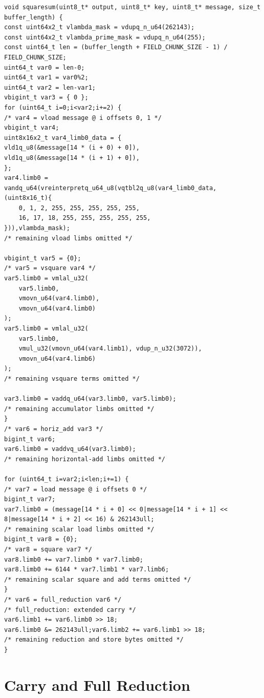 \begin{lstlisting}[style=thesisC,basicstyle=\scriptsize\ttfamily,caption={Excerpt of generated NEON C for the square-sum running example.},label={lst:squaresum-neon}]
void squaresum(uint8_t* output, uint8_t* key, uint8_t* message, size_t buffer_length) {
const uint64x2_t vlambda_mask = vdupq_n_u64(262143);
const uint64x2_t vlambda_prime_mask = vdupq_n_u64(255);
const uint64_t len = (buffer_length + FIELD_CHUNK_SIZE - 1) / FIELD_CHUNK_SIZE;
uint64_t var0 = len-0;
uint64_t var1 = var0%2;
uint64_t var2 = len-var1;
vbigint_t var3 = { 0 };
for (uint64_t i=0;i<var2;i+=2) {
/* var4 = vload message @ i offsets 0, 1 */
vbigint_t var4;
uint8x16x2_t var4_limb0_data = {
vld1q_u8(&message[14 * (i + 0) + 0]),
vld1q_u8(&message[14 * (i + 1) + 0]),
};
var4.limb0 =
vandq_u64(vreinterpretq_u64_u8(vqtbl2q_u8(var4_limb0_data, (uint8x16_t){
    0, 1, 2, 255, 255, 255, 255, 255,
    16, 17, 18, 255, 255, 255, 255, 255,
})),vlambda_mask);
/* remaining vload limbs omitted */

vbigint_t var5 = {0};
/* var5 = vsquare var4 */
var5.limb0 = vmlal_u32(
    var5.limb0,
    vmovn_u64(var4.limb0),
    vmovn_u64(var4.limb0)
);
var5.limb0 = vmlal_u32(
    var5.limb0,
    vmul_u32(vmovn_u64(var4.limb1), vdup_n_u32(3072)),
    vmovn_u64(var4.limb6)
);
/* remaining vsquare terms omitted */

var3.limb0 = vaddq_u64(var3.limb0, var5.limb0);
/* remaining accumulator limbs omitted */
}
/* var6 = horiz_add var3 */
bigint_t var6;
var6.limb0 = vaddvq_u64(var3.limb0);
/* remaining horizontal-add limbs omitted */

for (uint64_t i=var2;i<len;i+=1) {
/* var7 = load message @ i offsets 0 */
bigint_t var7;
var7.limb0 = (message[14 * i + 0] << 0|message[14 * i + 1] << 8|message[14 * i + 2] << 16) & 262143ull;
/* remaining scalar load limbs omitted */
bigint_t var8 = {0};
/* var8 = square var7 */
var8.limb0 += var7.limb0 * var7.limb0;
var8.limb0 += 6144 * var7.limb1 * var7.limb6;
/* remaining scalar square and add terms omitted */
}
/* var6 = full_reduction var6 */
/* full_reduction: extended carry */
var6.limb1 += var6.limb0 >> 18;
var6.limb0 &= 262143ull;var6.limb2 += var6.limb1 >> 18;
/* remaining reduction and store bytes omitted */
}
\end{lstlisting}

\section{Carry and Full Reduction}
\label{sec:carry-full-reduction}

